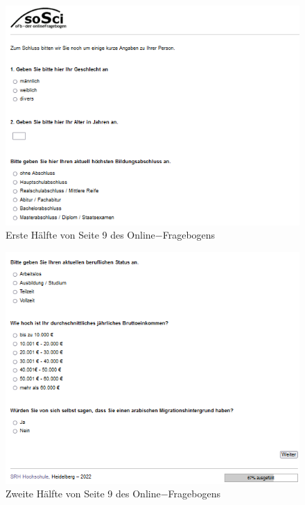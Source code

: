 \begin{appendices}
    \newpage
    \begin{figure}[htb!]
        \centering
            \includegraphics[width=\textwidth]{Seite 9_1.png}
            \caption[]{Erste Hälfte von Seite 9 des Online$-$Fragebogens}
    \end{figure}
    
    \newpage
    \begin{figure}[htb!]
        \centering
            \includegraphics[width=\textwidth]{Seite 9_2.png}
            \caption[]{Zweite Hälfte von Seite 9 des Online$-$Fragebogens}
    \end{figure}
    

\end{appendices}
